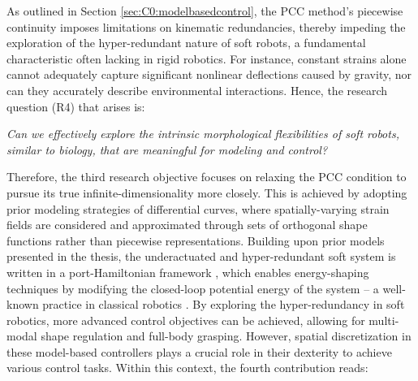 As outlined in Section \ref{sec:C0:modelbasedcontrol}, the PCC method's piecewise continuity imposes limitations on kinematic redundancies, thereby impeding the exploration of the hyper-redundant nature of soft robots, a fundamental characteristic often lacking in rigid robotics. For instance, constant strains alone cannot adequately capture significant nonlinear deflections caused by gravity, nor can they accurately describe environmental interactions. Hence, the research question (R4) that arises is:
%
\begin{center}
\textit{Can we effectively explore the intrinsic morphological flexibilities of soft robots, similar to biology, that are meaningful for modeling and control?}
\end{center}
%
Therefore, the third research objective focuses on relaxing the PCC condition to pursue its true infinite-dimensionality more closely. This is achieved by adopting prior modeling strategies of differential curves, where spatially-varying strain fields are considered and approximated through sets of orthogonal shape functions rather than piecewise representations. Building upon prior models presented in the thesis, the underactuated and hyper-redundant soft system is written in a port-Hamiltonian framework \cite{Schaft2004, Ortega2002}, which enables energy-shaping techniques by modifying the closed-loop potential energy of the system -- a well-known practice in classical robotics \cite{Schaft2004, Ortega1998, Ortega2002}. By exploring the hyper-redundancy in soft robotics, more advanced control objectives can be achieved, allowing for multi-modal shape regulation and full-body grasping. However, spatial discretization in these model-based controllers plays a crucial role in their dexterity to achieve various control tasks. Within this context, the fourth contribution reads:

